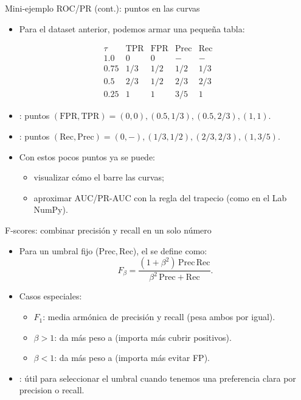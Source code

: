 \begin{frame}{Mini-ejemplo ROC/PR (cont.): puntos en las curvas}
\small
\begin{itemize}
  \item Para el dataset anterior, podemos armar una pequeña tabla:
\end{itemize}
\vspace{-0.4em}
\[
\begin{array}{c|c|c|c|c}
  \tau & \mathrm{TPR} & \mathrm{FPR} & \mathrm{Prec} & \mathrm{Rec} \\\hline
  1.0   & 0   & 0   & -   & -   \\
  0.75  & 1/3 & 1/2 & 1/2 & 1/3 \\
  0.5   & 2/3 & 1/2 & 2/3 & 2/3 \\
  0.25  & 1   & 1   & 3/5 & 1
\end{array}
\]
\vspace{-0.4em}
\begin{itemize}\small
  \item {}: puntos \((\mathrm{FPR},\mathrm{TPR}) = (0,0), (0.5,1/3), (0.5,2/3), (1,1)\).
  \item {}: puntos \((\mathrm{Rec},\mathrm{Prec}) = (0,{-}), (1/3,1/2), (2/3,2/3), (1,3/5)\).
  \item Con estos pocos puntos ya se puede:
  \begin{itemize}
    \item visualizar cómo el  barre las curvas;
    \item aproximar AUC/PR-AUC con la regla del trapecio (como en el Lab NumPy).
  \end{itemize}
\end{itemize}
\end{frame}

\begin{frame}{F-scores: combinar precisión y recall en un solo número}
\small
\begin{itemize}
  \item Para un umbral fijo (\(\mathrm{Prec},\mathrm{Rec}\)), el  se define como: \hfill {}
  \[
    F_\beta = \frac{(1+\beta^2)\,\mathrm{Prec}\,\mathrm{Rec}}{\beta^2\,\mathrm{Prec} + \mathrm{Rec}}.
  \]
  \item Casos especiales:
  \begin{itemize}
    \item \(F_1\): media armónica de precisión y recall (pesa ambos por igual).
    \item \(\beta>1\): da más peso a  (importa más cubrir positivos).
    \item \(\beta<1\): da más peso a  (importa más evitar FP).
  \end{itemize}
  \item {}: útil para seleccionar el umbral cuando tenemos una preferencia clara por precision o recall.
\end{itemize}
\end{frame}

